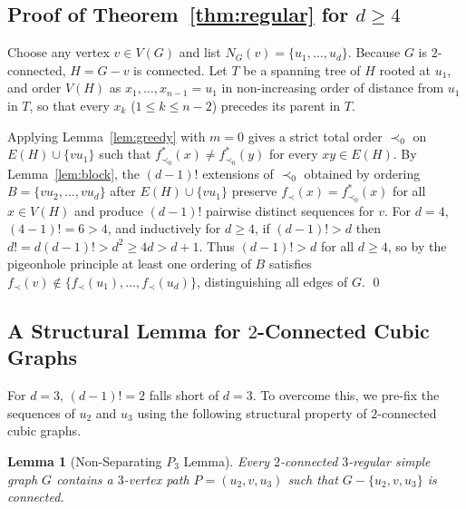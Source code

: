\documentclass[11pt,a4paper]{article}
\newtheorem{lemma}[theorem]{Lemma}
\begin{document}
\subsection{Proof of Theorem~\ref{thm:regular} for $d \ge 4$}

Choose any vertex $v \in V(G)$ and list $N_G(v) = \{u_1, \dots, u_d\}$. Because $G$ is $2$-connected, $H = G - v$ is connected. Let $T$ be a spanning tree of $H$ rooted at $u_1$, and order $V(H)$ as $x_1, \dots, x_{n-1} = u_1$ in non-increasing order of distance from $u_1$ in $T$, so that every $x_k$ ($1 \le k \le n - 2$) precedes its parent in $T$.

Applying Lemma~\ref{lem:greedy} with $m = 0$ gives a strict total order $\prec_0$ on $E(H) \cup \{v u_1\}$ such that $f^*_{\prec_0}(x) \neq f^*_{\prec_0}(y)$ for every $xy \in E(H)$. By Lemma~\ref{lem:block}, the $(d - 1)!$ extensions of $\prec_0$ obtained by ordering $B = \{v u_2, \dots, v u_d\}$ after $E(H) \cup \{v u_1\}$ preserve $f_\prec(x) = f^*_{\prec_0}(x)$ for all $x \in V(H)$ and produce $(d - 1)!$ pairwise distinct sequences for $v$. For $d = 4$, $(4 - 1)! = 6 > 4$, and inductively for $d \ge 4$, if $(d - 1)! > d$ then $d! = d(d - 1)! > d^2 \ge 4d > d + 1$. Thus $(d - 1)! > d$ for all $d \ge 4$, so by the pigeonhole principle at least one ordering of $B$ satisfies $f_\prec(v) \notin \{f_\prec(u_1), \dots, f_\prec(u_d)\}$, distinguishing all edges of $G$. \qed

\subsection{A Structural Lemma for $2$-Connected Cubic Graphs}

For $d = 3$, $(d - 1)! = 2$ falls short of $d = 3$. To overcome this, we pre-fix the sequences of $u_2$ and $u_3$ using the following structural property of $2$-connected cubic graphs.

\begin{lemma}[Non-Separating $P_3$ Lemma]
\label{lem:p3}
Every $2$-connected $3$-regular simple graph $G$ contains a $3$-vertex path $P = (u_2, v, u_3)$ such that $G - \{u_2, v, u_3\}$ is connected.
\end{lemma}
\end{document}
